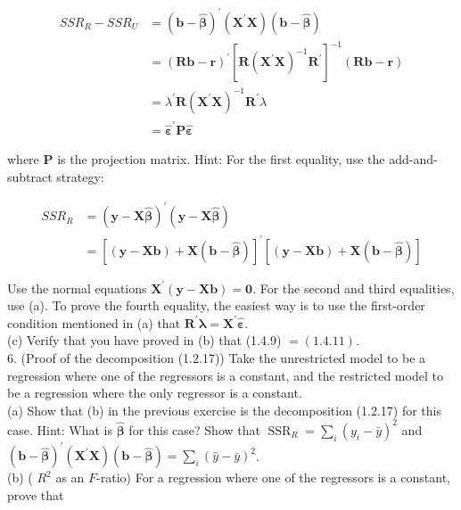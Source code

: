 \documentclass[10pt]{article}
\begin{document}
$$
\begin{aligned}
S S R_{R}-S S R_{U} & =(\mathbf{b}-\widehat{\boldsymbol{\beta}})^{\prime}\left(\mathbf{X}^{\prime} \mathbf{X}\right)(\mathbf{b}-\widehat{\boldsymbol{\beta}}) \\
& =(\mathbf{R} \mathbf{b}-\mathbf{r})^{\prime}\left[\mathbf{R}\left(\mathbf{X}^{\prime} \mathbf{X}\right)^{-1} \mathbf{R}^{\prime}\right]^{-1}(\mathbf{R} \mathbf{b}-\mathbf{r}) \\
& =\lambda^{\prime} \mathbf{R}\left(\mathbf{X}^{\prime} \mathbf{X}\right)^{-1} \mathbf{R}^{\prime} \lambda \\
& =\hat{\boldsymbol{\varepsilon}}^{\prime} \mathbf{P} \hat{\boldsymbol{\varepsilon}}
\end{aligned}
$$

where $\mathbf{P}$ is the projection matrix. Hint: For the first equality, use the add-and-subtract strategy:

$$
\begin{aligned}
S S R_{R} & =(\mathbf{y}-\mathbf{X} \widehat{\boldsymbol{\beta}})^{\prime}(\mathbf{y}-\mathbf{X} \widehat{\boldsymbol{\beta}}) \\
& =[(\mathbf{y}-\mathbf{X} \mathbf{b})+\mathbf{X}(\mathbf{b}-\widehat{\boldsymbol{\beta}})]^{\prime}[(\mathbf{y}-\mathbf{X} \mathbf{b})+\mathbf{X}(\mathbf{b}-\widehat{\boldsymbol{\beta}})]
\end{aligned}
$$

Use the normal equations $\mathbf{X}^{\prime}(\mathbf{y}-\mathbf{X b})=\mathbf{0}$. For the second and third equalities, use (a). To prove the fourth equality, the easiest way is to use the first-order condition mentioned in (a) that $\mathbf{R}^{\prime} \boldsymbol{\lambda}=\mathbf{X}^{\prime} \boldsymbol{\hat { \varepsilon }}$.\\
(c) Verify that you have proved in (b) that (1.4.9) $=(1.4 .11)$.\\
6. (Proof of the decomposition (1.2.17)) Take the unrestricted model to be a regression where one of the regressors is a constant, and the restricted model to be a regression where the only regressor is a constant.\\
(a) Show that (b) in the previous exercise is the decomposition (1.2.17) for this case. Hint: What is $\widehat{\boldsymbol{\beta}}$ for this case? Show that $\operatorname{SSR}_{R}=\sum_{i}\left(y_{i}-\bar{y}\right)^{2}$ and $(\mathbf{b}-\widehat{\boldsymbol{\beta}})^{\prime}\left(\mathbf{X}^{\prime} \mathbf{X}\right)(\mathbf{b}-\widehat{\boldsymbol{\beta}})=\sum_{i}(\hat{y}-\bar{y})^{2}$.\\
(b) ( $R^{2}$ as an $F$-ratio) For a regression where one of the regressors is a constant, prove that
\end{document}
